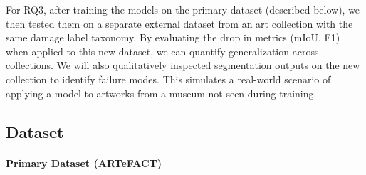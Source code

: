 \documentclass[conference]{IEEEtran}
\begin{document}
For RQ3, after training the models on the primary dataset (described below), we then tested them on a separate external dataset from an art collection with the same damage label taxonomy. By evaluating the drop in metrics (mIoU, F1) when applied to this new dataset, we can quantify generalization across collections. We will also qualitatively inspected segmentation outputs on the new collection to identify failure modes. This simulates a real-world scenario of applying a model to artworks from a museum not seen during training.

\subsection{Dataset}
\paragraph*{Primary Dataset (ARTeFACT)}
\end{document}
